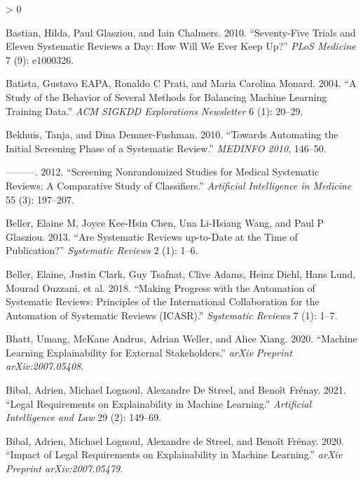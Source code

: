 \documentclass{article}
\newlength{\cslhangindent}
\newenvironment{CSLReferences}[2] %
 {%
  \setlength{\parindent}{0pt}
  \ifodd #1 \everypar{\setlength{\hangindent}{\cslhangindent}}\ignorespaces\fi
  \ifnum #2 > 0
  \setlength{\parskip}{#2\baselineskip}
  \fi
 }%
 {}
\begin{document}
\begin{CSLReferences}{1}{0}
\leavevmode\hypertarget{ref-bastian2010seventy}{}%
Bastian, Hilda, Paul Glasziou, and Iain Chalmers. 2010. {``Seventy-Five
Trials and Eleven Systematic Reviews a Day: How Will We Ever Keep Up?''}
\emph{PLoS Medicine} 7 (9): e1000326.

\leavevmode\hypertarget{ref-batista2004study}{}%
Batista, Gustavo EAPA, Ronaldo C Prati, and Maria Carolina Monard. 2004.
{``A Study of the Behavior of Several Methods for Balancing Machine
Learning Training Data.''} \emph{ACM SIGKDD Explorations Newsletter} 6
(1): 20--29.

\leavevmode\hypertarget{ref-bekhuis2010towards}{}%
Bekhuis, Tanja, and Dina Demner-Fushman. 2010. {``Towards Automating the
Initial Screening Phase of a Systematic Review.''} \emph{MEDINFO 2010},
146--50.

\leavevmode\hypertarget{ref-bekhuis2012screening}{}%
---------. 2012. {``Screening Nonrandomized Studies for Medical
Systematic Reviews: A Comparative Study of Classifiers.''}
\emph{Artificial Intelligence in Medicine} 55 (3): 197--207.

\leavevmode\hypertarget{ref-beller2013systematic}{}%
Beller, Elaine M, Joyce Kee-Hsin Chen, Una Li-Hsiang Wang, and Paul P
Glasziou. 2013. {``Are Systematic Reviews up-to-Date at the Time of
Publication?''} \emph{Systematic Reviews} 2 (1): 1--6.

\leavevmode\hypertarget{ref-beller2018making}{}%
Beller, Elaine, Justin Clark, Guy Tsafnat, Clive Adams, Heinz Diehl,
Hans Lund, Mourad Ouzzani, et al. 2018. {``Making Progress with the
Automation of Systematic Reviews: Principles of the International
Collaboration for the Automation of Systematic Reviews (ICASR).''}
\emph{Systematic Reviews} 7 (1): 1--7.

\leavevmode\hypertarget{ref-bhatt2020machine}{}%
Bhatt, Umang, McKane Andrus, Adrian Weller, and Alice Xiang. 2020.
{``Machine Learning Explainability for External Stakeholders.''}
\emph{arXiv Preprint arXiv:2007.05408}.

\leavevmode\hypertarget{ref-bibal2021legal}{}%
Bibal, Adrien, Michael Lognoul, Alexandre De Streel, and Benoît Frénay.
2021. {``Legal Requirements on Explainability in Machine Learning.''}
\emph{Artificial Intelligence and Law} 29 (2): 149--69.

\leavevmode\hypertarget{ref-bibal2020impact}{}%
Bibal, Adrien, Michael Lognoul, Alexandre de Streel, and Benoît Frénay.
2020. {``Impact of Legal Requirements on Explainability in Machine
Learning.''} \emph{arXiv Preprint arXiv:2007.05479}.


\end{CSLReferences}
\end{document}
